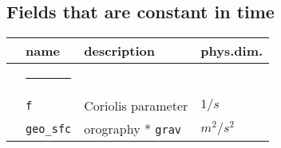 %

\subsection{Fields that are constant in time}  
\begin{tabular}{l l l l}  
& \parbox{.15\textwidth}{name} & \parbox{.65\textwidth}{description} & 
\parbox{.1\textwidth}{phys.dim.} \\ \hline  
& \rule{4ex}{0pt} & \\[-10pt]  
& \texttt{f}   & Coriolis parameter & $1/s$ \\  
& \texttt{geo\_sfc}   & orography * \texttt{grav} & $m^2/s^2$ \\  
\end{tabular}  
  
